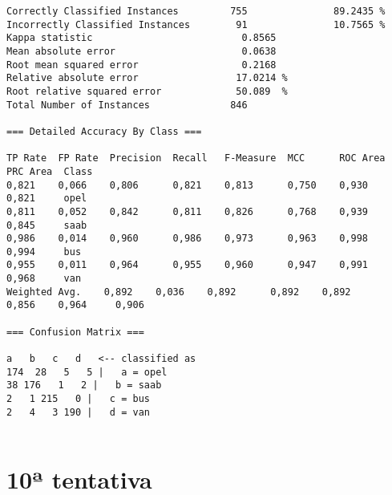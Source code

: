 \documentclass[
	article,			%
	11pt,				%
	oneside,			%
	a4paper,			%
	english,			%
	brazil,				%
	sumario=tradicional
	]{abntex2}
\begin{document}
\begin{lstlisting}
Correctly Classified Instances         755               89.2435 %
Incorrectly Classified Instances        91               10.7565 %
Kappa statistic                          0.8565
Mean absolute error                      0.0638
Root mean squared error                  0.2168
Relative absolute error                 17.0214 %
Root relative squared error             50.089  %
Total Number of Instances              846     

=== Detailed Accuracy By Class ===

TP Rate  FP Rate  Precision  Recall   F-Measure  MCC      ROC Area  PRC Area  Class
0,821    0,066    0,806      0,821    0,813      0,750    0,930     0,821     opel
0,811    0,052    0,842      0,811    0,826      0,768    0,939     0,845     saab
0,986    0,014    0,960      0,986    0,973      0,963    0,998     0,994     bus
0,955    0,011    0,964      0,955    0,960      0,947    0,991     0,968     van
Weighted Avg.    0,892    0,036    0,892      0,892    0,892      0,856    0,964     0,906     

=== Confusion Matrix ===

a   b   c   d   <-- classified as
174  28   5   5 |   a = opel
38 176   1   2 |   b = saab
2   1 215   0 |   c = bus
2   4   3 190 |   d = van


\end{lstlisting}

\newpage

\section{10ª tentativa}
\end{document}
